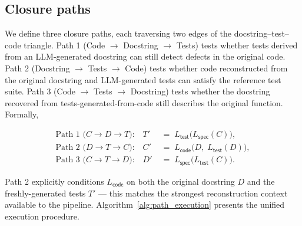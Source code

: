 \subsection{Closure paths}

We define three closure paths, each traversing two edges of the docstring--test--code triangle. Path 1 (Code $\to$ Docstring $\to$ Tests) tests whether tests derived from an LLM-generated docstring can still detect defects in the original code. Path 2 (Docstring $\to$ Tests $\to$ Code) tests whether code reconstructed from the original docstring and LLM-generated tests can satisfy the reference test suite. Path 3 (Code $\to$ Tests $\to$ Docstring) tests whether the docstring recovered from tests-generated-from-code still describes the original function. Formally,

\begin{align}
  \text{Path 1 (}C \to D \to T\text{):} \quad
  T' &\;=\; L_{\textsf{test}}\bigl(L_{\textsf{spec}}(C)\bigr), \label{eq:path1}\\
  \text{Path 2 (}D \to T \to C\text{):} \quad
  C' &\;=\; L_{\textsf{code}}\bigl(D,\; L_{\textsf{test}}(D)\bigr), \label{eq:path2}\\
  \text{Path 3 (}C \to T \to D\text{):} \quad
  D' &\;=\; L_{\textsf{spec}}\bigl(L_{\textsf{test}}(C)\bigr). \label{eq:path3}
\end{align}

Path 2 explicitly conditions $L_{\textsf{code}}$ on both the original docstring $D$ and the freshly-generated tests $T'$ --- this matches the strongest reconstruction context available to the pipeline. Algorithm~\ref{alg:path_execution} presents the unified execution procedure.


